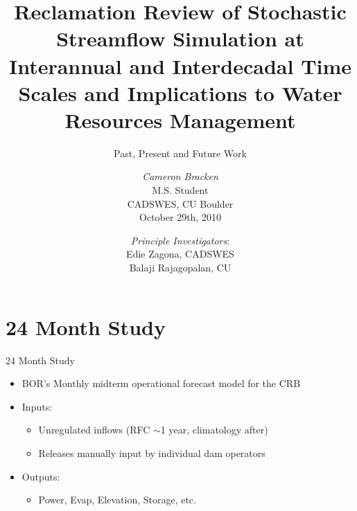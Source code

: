 \documentclass{beamer}
\title[Past, Present and Future Work]{Reclamation Review of Stochastic Streamflow Simulation at Interannual and Interdecadal Time Scales and Implications to Water Resources Management}
\subtitle{Past, Present and Future Work}
\author[\it Cameron Bracken]{{\it Cameron Bracken}\small\\M.S. Student\\CADSWES, CU Boulder\\October 29th, 2010}
\date{{\it Principle Investigators}:\small\\Edie Zagona, CADSWES\\Balaji Rajagopalan, CU}
\begin{document}
\begin{frame}
\titlepage
\end{frame}

\section{24 Month Study}
\begin{frame}{24 Month Study}
\begin{itemize}
	\item BOR's Monthly midterm operational forecast model for the CRB
	\item Inputs: 
		\begin{itemize}
			\item Unregulated inflows (RFC $\sim$1 year, climatology after)
			\item Releases manually input by individual dam operators
		\end{itemize}
	\item Outputs: 
	\begin{itemize}
		\item Power, Evap, Elevation, Storage, etc. 
	\end{itemize}
\end{itemize}
\end{frame}

\end{document}
